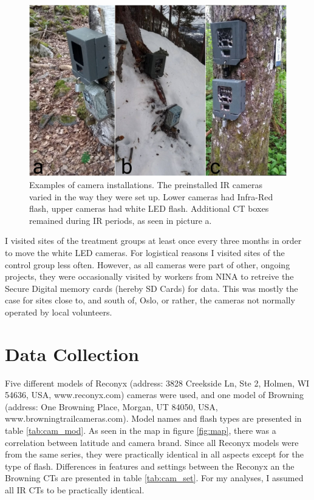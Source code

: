 \begin{figure}
			\centering
			\includegraphics[width=\textwidth]{./img/cam_example/install_ex4.jpg}
			\caption[Examples of camera installations]
	{Examples of camera installations.  \small %
		The preinstalled IR cameras varied in the way they were set up. Lower cameras had Infra-Red flash, upper cameras had white LED flash. Additional CT boxes remained during IR periods, as seen in picture a.}
	\label{fig:cam_ex_main}
\end{figure}



I visited sites of the treatment groups at least once every three months in order to move the white LED cameras.
For logistical reasons I visited sites of the control group less often.
However, as all cameras were part of other, ongoing projects, they were occasionally visited by workers from NINA to retreive the Secure Digital memory cards (hereby SD Cards) for data. %
This was mostly the case for sites close to, and south of, Oslo, or rather, the cameras not normally operated by local volunteers.








\section{Data Collection} 


Five different models of Reconyx (address: 3828 Creekside Ln, Ste 2, Holmen, WI 54636, USA, www.reconyx.com) cameras were used, 
and one model of Browning (address: One Browning Place, Morgan, UT 84050, USA, www.browningtrailcameras.com).
Model names and flash types are presented in table \ref{tab:cam_mod}.  
As seen in the map in figure \ref{fig:map}, there was a correlation between latitude and camera brand.
Since all Reconyx models were from the same series, they were practically identical in all aspects except for the type of flash. Differences in features and settings between the Reconyx an the Browning CTs are presented in table \ref{tab:cam_set}. For my analyses, I assumed all IR CTs to be practically identical.


